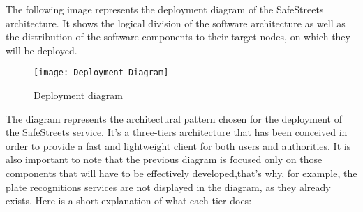 The following image represents the deployment diagram of the SafeStreets architecture. It shows the logical division of the software architecture as well as the distribution of the software components to their target nodes, on which they will be deployed.

\begin{figure}[H]
  \centering
  \texttt{[image: Deployment\_Diagram]}
  \caption{Deployment diagram}
  \label{fig:deployment_diag}
\end{figure}

The diagram represents the architectural pattern chosen for the deployment of the SafeStreets service. It's a three-tiers architecture that has been conceived in order to provide a fast and lightweight client for both users and authorities. 
It is also important to note that the previous diagram is focused only on those components that will have to be effectively developed,that's why, for example, the plate recognitions services are not displayed in the diagram, as they already exists.
Here is a short explanation of what each tier does:
